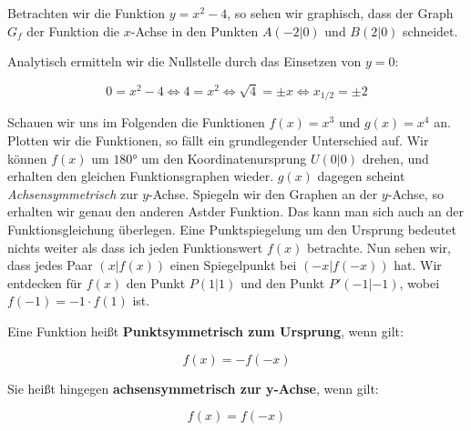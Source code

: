 \documentclass[ngerman, 12pt]{nssheetxea}
\begin{document}
\begin{example}
Betrachten wir die Funktion $y=x^2-4$, so sehen wir graphisch, dass der Graph $G_f$ der Funktion die $x$-Achse in den Punkten $A(-2|0)$ und $B(2|0)$ schneidet. 

\begin{center}
\end{center}

Analytisch ermitteln wir die Nullstelle durch das Einsetzen von $y=0$: 

\[ 0 = x^2 -4 \Leftrightarrow 4 = x^2 \Leftrightarrow \sqrt{4} = \pm x \Leftrightarrow x_{1/2}=\pm 2  \]
\end{example}

Schauen wir uns im Folgenden die Funktionen $f(x)=x^3$ und $g(x)=x^4$ an. Plotten wir die Funktionen, so fällt ein grundlegender Unterschied auf. Wir können $f(x)$ um $\ang{180}$ um den Koordinatenursprung $U(0|0)$ drehen, und erhalten den gleichen Funktionsgraphen wieder. $g(x)$ dagegen scheint \textit{Achsensymmetrisch} zur $y$-Achse. Spiegeln wir den Graphen an der $y$-Achse, so erhalten wir genau den anderen \glqq Ast\grqq der Funktion. Das kann man sich auch an der Funktionsgleichung überlegen. 
Eine Punktspiegelung um den Ursprung bedeutet nichts weiter als dass ich jeden Funktionswert $f(x)$ betrachte. Nun sehen wir, dass jedes Paar $(x|f(x))$ einen Spiegelpunkt bei $(-x|f(-x))$ hat. Wir entdecken für $f(x)$ den Punkt $P(1|1)$ und den Punkt $P'(-1|-1)$, wobei $f(-1)=-1 \cdot f(1)$ ist. 

\begin{definition}
Eine Funktion heißt \textbf{Punktsymmetrisch zum Ursprung}, wenn gilt:

\[ f(x) = - f(-x)\]

Sie heißt hingegen \textbf{achsensymmetrisch zur y-Achse}, wenn gilt:

\[ f(x)= f(-x)\]
\end{definition}
\end{document}
